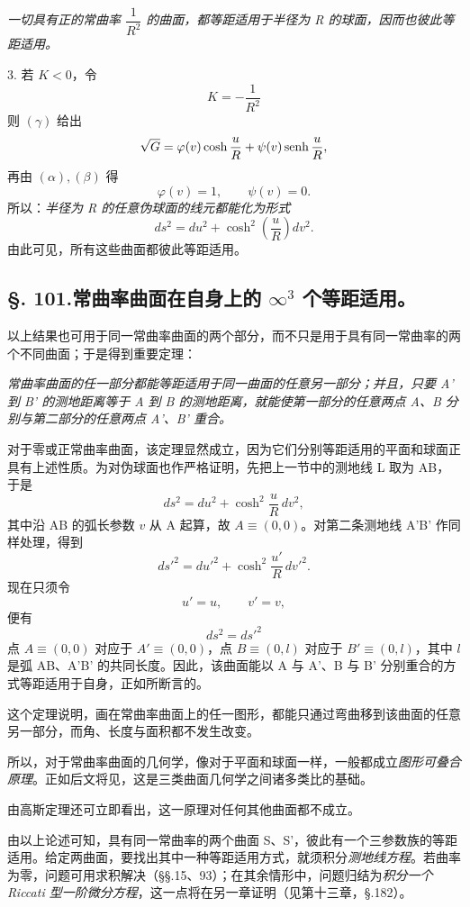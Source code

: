 \emph{一切具有正的常曲率 \(\dfrac1{R^2}\) 的曲面，都等距适用于半径为 R 的球面，因而也彼此等距适用。}

3. 若 \(K<0\)，令
\[
 K=-\frac1{R^2}
\]
则 \((\gamma)\) 给出
\[
 \sqrt G=\varphi(v)\cosh\frac{u}{R}+\psi(v)\operatorname{senh}\frac{u}{R},
\]
再由 \((\alpha),(\beta)\) 得
\[
 \varphi(v)=1,
 \qquad \psi(v)=0.
\]
所以：\emph{半径为 R 的任意伪球面的线元都能化为形式}
\begin{equation}\tag{7}
 ds^2=du^2+\cosh^2\left(\frac{u}{R}\right)dv^2.
\end{equation}
由此可见，所有这些曲面都彼此等距适用。

\subsection*{\S. 101.\quad 常曲率曲面在自身上的 \(\infty^3\) 个等距适用。}

以上结果也可用于同一常曲率曲面的两个部分，而不只是用于具有同一常曲率的两个不同曲面；于是得到重要定理：

\emph{常曲率曲面的任一部分都能等距适用于同一曲面的任意另一部分；并且，只要 A' 到 B' 的测地距离等于 A 到 B 的测地距离，就能使第一部分的任意两点 A、B 分别与第二部分的任意两点 A'、B' 重合。}

对于零或正常曲率曲面，该定理显然成立，因为它们分别等距适用的平面和球面正具有上述性质。为对伪球面也作严格证明，先把上一节中的测地线 L 取为 AB，于是
\[
 ds^2=du^2+\cosh^2\frac{u}{R}\,dv^2,
\]
其中沿 AB 的弧长参数 \(v\) 从 A 起算，故 \(A\equiv(0,0)\)。对第二条测地线 A'B' 作同样处理，得到
\[
 ds'^2=du'^2+\cosh^2\frac{u'}{R}\,dv'^2.
\]
现在只须令
\[
 u'=u,
 \qquad v'=v,
\]
便有
\[
 ds^2=ds'^2
\]
点 \(A\equiv(0,0)\) 对应于 \(A'\equiv(0,0)\)，点 \(B\equiv(0,l)\) 对应于 \(B'\equiv(0,l)\)，其中 \(l\) 是弧 AB、A'B' 的共同长度。因此，该曲面能以 A 与 A'、B 与 B' 分别重合的方式等距适用于自身，正如所断言的。

这个定理说明，画在常曲率曲面上的任一图形，都能只通过弯曲移到该曲面的任意另一部分，而角、长度与面积都不发生改变。

所以，对于常曲率曲面的几何学，像对于平面和球面一样，一般都成立\emph{图形可叠合原理}。正如后文将见，这是三类曲面几何学之间诸多类比的基础。

由高斯定理还可立即看出，这一原理对任何其他曲面都不成立。

由以上论述可知，具有同一常曲率的两个曲面 S、S'，彼此有一个三参数族的等距适用。给定两曲面，要找出其中一种等距适用方式，就须积分\emph{测地线方程}。若曲率为零，问题可用求积解决（\S\S.15、93）；在其余情形中，问题归结为\emph{积分一个 Riccati 型一阶微分方程}，这一点将在另一章证明（见第十三章，\S.182）。

